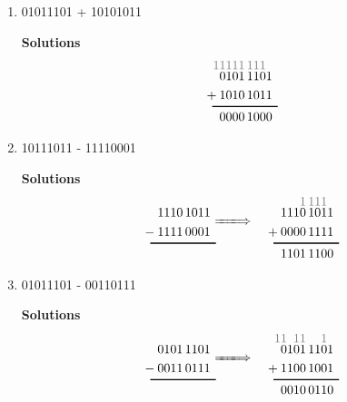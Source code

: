 \begin{enumerate}
\begin{enumerate}
                \item 01011101 + 10101011

                    \begin{onlysolution} \textbf{Solutions}
                        \begin{align*}
                            {\color{gray}
                            11111\,111\0}&\\[-1.5ex]
                            0101\,1101&\\
                            +\:1010\,1011&\\[-2ex]
                            \rule{12ex}{1pt}\hspace{-1ex}&\\[-1ex]
                            0000\,1000&
                        \end{align*}
                    \end{onlysolution}

                \item 10111011 - 11110001

                    \begin{onlysolution} \textbf{Solutions}
                        \begin{alignat*}{3}
                            &&{\color{gray}
                            1\,111\0 }\\[-1.5ex]
                            1110\,1011&   &1110\,1011\\
                            -\:1111\,0001&&+\:0000\,1111\\[-2ex]
                            \rule{12ex}{1pt}\hspace{-1ex}&\ \raisebox{3.5ex}[0pt][0pt]{$\xLongrightarrow{\phantom{80em}}$}\ &\rule{12ex}{1pt}\hspace{-1ex}\\[-1ex]
                            & &1101\,1100
                        \end{alignat*}
                    \end{onlysolution}

                \item 01011101 - 00110111

                    \begin{onlysolution} \textbf{Solutions}
                        \begin{alignat*}{3}
                            &&{\color{gray}
                            11\011\9\01\0 }\\[-1.5ex]
                            0101\,1101&&   0101\,1101\\
                            -\:0011\,0111&&+\:1100\,1001\\[-2ex]
                            \rule{12ex}{1pt}\hspace{-1ex}&\ \raisebox{3.5ex}[0pt][0pt]{$\xLongrightarrow{\phantom{80em}}$}\ &\rule{12ex}{1pt}\hspace{-1ex}\\[-1ex]
                            &&   0010\,0110
                        \end{alignat*}
                    \end{onlysolution}


\end{enumerate}
\end{enumerate}
